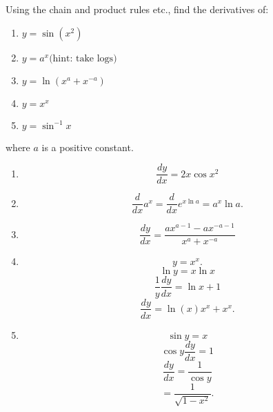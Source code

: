 Using the chain and product rules etc., find the derivatives of:
\begin{enumerate}
\item $y = \sin(x^2)$
\item $y = a^x\text{(hint: take logs)}$
\item $y = \ln(x^a + x^{-a})$
\item $y = x^x$
\item $y = \sin^{-1}x$
\end{enumerate}
where $a$ is a positive constant.

\begin{enumerate}
\item
\[
\frac{dy}{dx} = 2x\cos x^2 
\]
\item
\[
\frac{d}{dx}a^x = \frac{d}{dx}e^{x\ln a} = a^x \ln a.
\]
\item
\[
\frac{dy}{dx} = \frac{ax^{a-1} -ax^{-a-1}}{x^a + x^{-a}}
\]
\item
\[
y = x^x. 
\]
\[
\ln y = x \ln x 
\]
\[
\frac{1}{y}\frac{dy}{dx} = \ln x + 1
\]
\[
\frac{dy}{dx} = \ln(x)x^x + x^x.
\]
\item
\[
\sin y = x 
\]
\[
\cos y \frac{dy}{dx} = 1
\]
\[
\frac{dy}{dx} = \frac{1}{\cos{y}}
\]
\[
= \frac{1}{\sqrt{1-x^2}}.
\]
\end{enumerate}